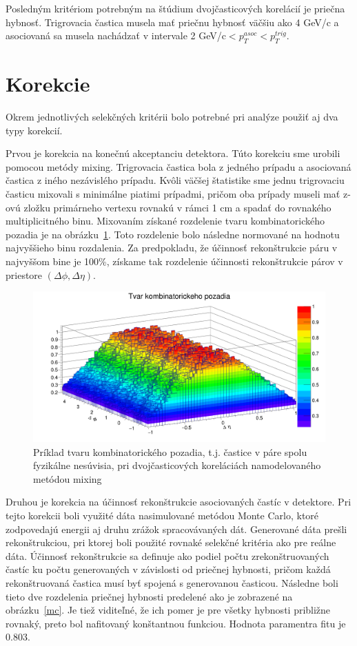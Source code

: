 \documentclass[thesismargins, thesislinespacing]{rnthesis}
\begin{document}
Posledným kritériom potrebným na štúdium dvojčasticových korelácií je priečna hybnosť. Trigrovacia častica musela mať priečnu hybnosť väčšiu ako 4 GeV/c a asociovaná sa musela nachádzať v intervale 2 GeV/c$<p_T^{asoc}<p_T^{trig}$.

\section{Korekcie}
Okrem jednotlivých selekčných kritérii bolo potrebné pri analýze použiť aj dva typy korekcií. 

Prvou je korekcia na konečnú akceptanciu detektora. Túto korekciu sme urobili pomocou metódy mixing. Trigrovacia častica bola z jedného prípadu a asociovaná častica z iného nezávislého prípadu. Kvôli väčšej štatistike sme jednu trigrovaciu časticu mixovali s minimálne piatimi prípadmi, pričom oba prípady museli mať z-ovú zložku primárneho vertexu rovnakú v rámci 1 cm a spadať do rovnakého multiplicitného binu. Mixovaním získané rozdelenie tvaru kombinatorického pozadia je na obrázku~\ref{pozadie}. Toto rozdelenie bolo následne normované na hodnotu najvyššieho binu rozdalenia. Za predpokladu, že účinnosť rekonštrukcie páru v najvyššom bine je 100\%, získame tak rozdelenie účinnosti rekonštrukcie párov v priestore $(\Delta \phi,\Delta\eta)$.

\begin{figure}[hbtp!]
	\centering
	\includegraphics[scale=0.2]{./Obrazky_praca/pozadie.png}
	\caption{Príklad tvaru kombinatorického pozadia, t.j. častice v páre spolu fyzikálne nesúvisia, pri dvojčasticových koreláciách namodelovaného metódou mixing}
	\label{pozadie}
\end{figure}

Druhou je korekcia na účinnosť rekonštrukcie asociovaných častíc v detektore. Pri tejto korekcii boli využité dáta nasimulované metódou Monte Carlo, ktoré zodpovedajú energii aj druhu zrážok spracovávaných dát. Generované dáta prešli \-re\-kon\-štruk\-ciou, pri ktorej boli použité rovnaké selekčné kritéria ako pre reálne dáta. Účinnosť re\-kon\-štruk\-cie sa definuje ako podiel počtu zrekonštruovaných častíc ku počtu generovaných v závislosti od priečnej hybnosti, pričom každá rekonštruovaná častica musí byť spojená s generovanou časticou. Následne boli tieto dve rozdelenia priečnej hybnosti predelené ako je zobrazené na obrázku~\ref{mc}. Je tiež viditeľné, že ich pomer je pre všetky hybnosti približne rovnaký, preto bol nafitovaný konštantnou funkciou. Hodnota paramentra fitu je 0.803.
\end{document}
